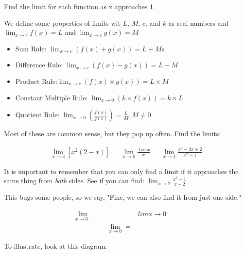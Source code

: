 \documentclass[11pt]{article}
\begin{document}
\noindent Find the limit for each function as x approaches 1.

\vspace{1.5cm}

We define some properties of limits wit $L$, $M$, $c$, and $k$ as real numbers and $\lim_{x\to c} f(x) = L$ and $\lim_{x\to c} g(x) = M$
\begin{itemize}
    \item Sum Rule: $\lim_{x\to c}(f(x) + g(x)) = L + M$s
    \item Difference Rule: $\lim_{x\to c}(f(x) - g(x)) = L + M$
    \item Product Rule:$\lim_{x\to c}(f(x) \times g(x)) = L \times M$
    \item Constant Multiple Rule: $\lim_{x\to0}(k \times f(x)) = k \times L$
    \item Quotient Rule:  $\lim_{x\to0} (\frac{f(x)}{g(x)}) = \frac{L}{M}, M \neq 0$
\end{itemize}

\newpage

Most of these are common sense, but they pop up often. Find the limits:

\begin{align*}
    \lim_{x\to3}[x^2(2-x)] && \lim_{x\to0}\frac{\tan x}{x} && \lim_{x\to1}\frac{x^2 - 3x + 2}{x^2 - 1}
\end{align*}

\vspace{1.5cm}

It is important to remember that you can only find a limit if it approaches the same thing from \emph{both} sides. See if you can find: $\lim_{x\to2}\frac{x^3 - 1}{x - 2}$

\vspace{1.5cm}

This bugs some people, so we say, "Fine, we can also find it from just one side:"

\begin{align*}
    \lim_{x\to 0^-} = && lim{x\to 0^+} =\\
    &\lim_{x\to 0} =
\end{align*}

To illustrate, look at this diagram:

\end{document}
